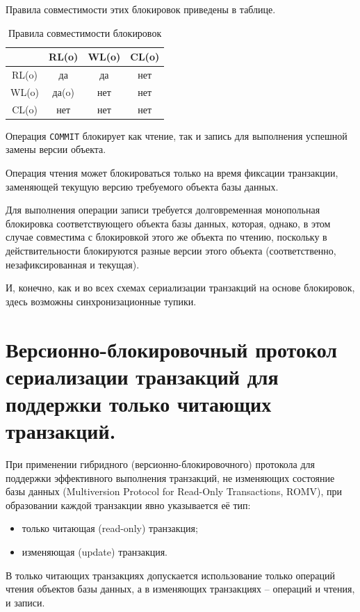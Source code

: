 \documentclass[a4paper,12pt]{article}
\begin{document}
Правила совместимости этих блокировок приведены в таблице.

\begin{table}[h!]
    \centering
    \begin{tabular}{|c|c|c|c|}
        \hline
          & RL(o) & WL(o) & CL(o) \\
        \hline
        RL(o) & да & да & нет \\
        WL(o) & да(o) & нет & нет \\
        CL(o) & нет & нет & нет \\
        \hline
    \end{tabular}
    \caption{Правила совместимости блокировок}
\end{table}

Операция \texttt{COMMIT} блокирует как чтение, так и запись для выполнения успешной замены версии объекта.

Операция чтения может блокироваться только на время фиксации транзакции, заменяющей текущую версию требуемого объекта базы данных.

Для выполнения операции записи требуется долговременная монопольная блокировка соответствующего объекта базы данных, которая, однако, в этом случае совместима с блокировкой этого же объекта по чтению, поскольку в действительности блокируются разные версии этого объекта (соответственно, незафиксированная и текущая).

И, конечно, как и во всех схемах сериализации транзакций на основе блокировок, здесь возможны синхронизационные тупики.

\section{Версионно-блокировочный протокол сериализации транзакций для поддержки только читающих транзакций.}

При применении гибридного (версионно-блокировочного) протокола для поддержки эффективного выполнения транзакций, не изменяющих состояние базы данных (Multiversion Protocol for Read-Only Transactions, ROMV), при образовании каждой транзакции явно указывается её тип:
\begin{itemize}
    \item только читающая (read-only) транзакция;
    \item изменяющая (update) транзакция.
\end{itemize}

В только читающих транзакциях допускается использование только операций чтения объектов базы данных, а в изменяющих транзакциях – операций и чтения, и записи.
\end{document}
